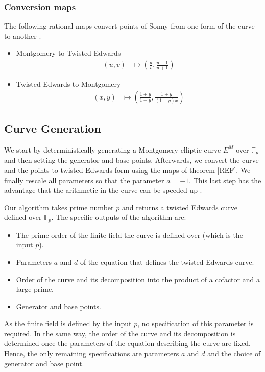 \documentclass{article}
\newcommand{\Fp}{\ensuremath{\mathbb{F}_p}}
\theoremstyle{definition}
\theoremstyle{remark}
\begin{document}
	\subsubsection{Conversion maps}
	The following rational maps convert points of Sonny from one form of the curve to another \cite[Theorem 3.2]{teds}. %
	\begin{itemize}
		\item Montgomery to Twisted Edwards
		\begin{align}
			\label{eq-mon-to-ted}
			(u, v)&\mapsto \left(\frac{u}{v}, \frac{u-1}{u+1}\right)
		\end{align}
		\item Twisted Edwards to Montgomery
		\begin{align}
			\label{eq-ted-to-mon}
			(x, y)&\mapsto \left(\frac{1+y}{1-y}, \frac{1+y}{(1-y)x}\right)
		\end{align}		
	\end{itemize}
	
	\subsection{Curve Generation}
	
	We start by deterministically generating a Montgomery elliptic curve $E^M$ over $\Fp$ and then setting the generator and base points. Afterwards, we convert the curve and the points to twisted Edwards form using the maps of theorem [REF]. %
	We finally rescale all parameters so that the parameter $a = -1$. This last step has the advantage that the arithmetic in the curve can be speeded up \cite{scaling}. %
	
	Our algorithm takes prime number $p$ and returns a twisted Edwards curve defined over $\Fp$. The specific outputs of the algorithm are:
	\begin{itemize}
		\item The prime order of the finite field the curve is defined over (which is the input $p$).
		\item Parameters $a$ and $d$ of the equation that defines the twisted Edwards curve.
		\item Order of the curve and its decomposition into the product of a cofactor and a large prime. 
		\item Generator and base points.
	\end{itemize}
	
	As the finite field is defined by the input $p$, no specification of this parameter is required. In the same way, the order of the curve and its decomposition is determined once the parameters of the equation describing the curve are fixed. Hence, the only remaining specifications are parameters $a$ and $d$ and the choice of generator and base point. 
	
\end{document}
